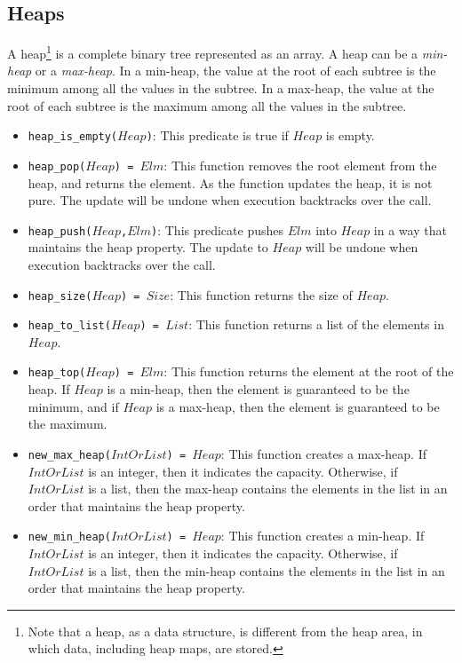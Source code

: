 \subsection{Heaps}
A heap\footnote{Note that a heap, as a data structure, is different from the heap area, in which data, including heap maps, are stored.} is a complete binary tree represented as an array. A heap can be a \emph{min-heap} or a \emph{max-heap}. In a min-heap, the value at the root of each subtree is the minimum among all the values in the subtree. In a max-heap, the value at the root of each subtree is the maximum among all the values in the subtree.
\begin{itemize}
\item \texttt{heap\_is\_empty($Heap$)}: This predicate is true if $Heap$ is empty.
\item \texttt{heap\_pop($Heap$) = $Elm$}: This function removes the root element from the heap, and returns the element. As the function updates the heap, it is not pure. The update will be undone when execution backtracks over the call.
\item \texttt{heap\_push($Heap$,$Elm$)}: This predicate pushes $Elm$ into $Heap$ in a way that maintains the heap property. The update to $Heap$ will be undone when execution backtracks over the call.
\item \texttt{heap\_size($Heap$) = $Size$}: This function returns the size of $Heap$.
\item \texttt{heap\_to\_list($Heap$) = $List$}: This function returns a list of the elements in $Heap$.
\item \texttt{heap\_top($Heap$) = $Elm$}: This function returns the element at the root of the heap. If $Heap$ is a min-heap, then the element is guaranteed to be the minimum, and if $Heap$ is a max-heap, then the element is guaranteed to be the maximum.
\item \texttt{new\_max\_heap($IntOrList$) = $Heap$}: This function creates a max-heap.  If $IntOrList$ is an integer, then it indicates the capacity.  Otherwise, if $IntOrList$ is a list, then the max-heap contains the elements in the list in an order that maintains the heap property.
\item \texttt{new\_min\_heap($IntOrList$) = $Heap$}: This function creates a min-heap.  If $IntOrList$ is an integer, then it indicates the capacity.  Otherwise, if $IntOrList$ is a list, then the min-heap contains the elements in the list in an order that maintains the heap property.
\end{itemize}

